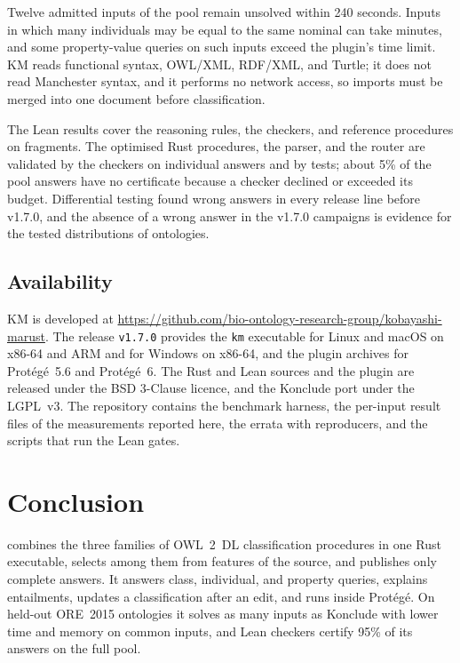 Twelve admitted inputs of the pool remain unsolved within 240 seconds.  Inputs
in which many individuals may be equal to the same nominal can take minutes,
and some property-value queries on such inputs exceed the plugin's time limit.
KM reads functional syntax, OWL/XML, RDF/XML, and Turtle; it does not read
Manchester syntax, and it performs no network access, so imports must be
merged into one document before classification.

The Lean results cover the reasoning rules, the checkers, and reference
procedures on fragments.  The optimised Rust procedures, the parser, and the
router are validated by the checkers on individual answers and by tests; about
5\% of the pool answers have no certificate because a checker declined or
exceeded its budget.  Differential testing found wrong answers in every release
line before v1.7.0, and the absence of a wrong answer in the v1.7.0 campaigns
is evidence for the tested distributions of ontologies.

\subsection{Availability}
\label{sec:availability}

KM is developed at
\url{https://github.com/bio-ontology-research-group/kobayashi-marust}.  The
release \texttt{v1.7.0} provides the \texttt{km} executable for Linux and macOS
on x86-64 and ARM and for Windows on x86-64, and the plugin archives for
Prot\'eg\'e~5.6 and Prot\'eg\'e~6.  The Rust and Lean sources and the plugin are
released under the BSD 3-Clause licence, and the Konclude port under the
LGPL~v3.  The repository contains the benchmark harness, the per-input result
files of the measurements reported here, the errata with reproducers, and the
scripts that run the Lean gates.  

\section{Conclusion}

\KM{} combines the three families of OWL~2~DL classification procedures in one
Rust executable, selects among them from features of the source, and publishes
only complete answers.  It answers class, individual, and property queries,
explains entailments, updates a classification after an edit, and runs inside
Prot\'eg\'e.  On held-out ORE~2015 ontologies it solves as many inputs as
Konclude with lower time and memory on common inputs, and Lean checkers certify
95\% of its answers on the full pool.
